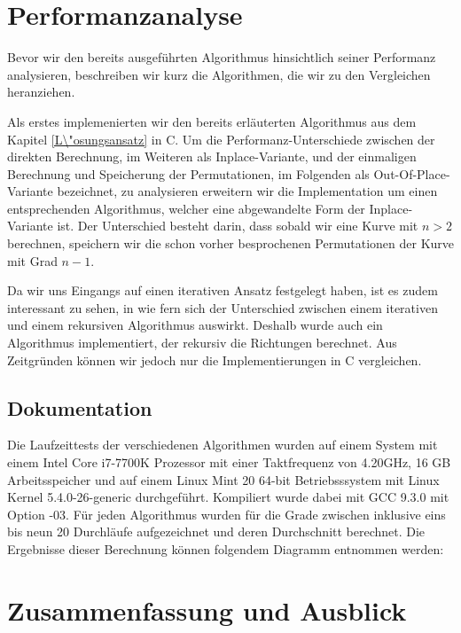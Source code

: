 \documentclass[course=asp]{aspdoc}
\begin{document}
\newpage
\section{Performanzanalyse} \label{Performanzanalyse}
Bevor wir den bereits ausgef\"uhrten Algorithmus hinsichtlich seiner Performanz analysieren, beschreiben wir kurz die Algorithmen, die wir zu den Vergleichen heranziehen.

Als erstes implemenierten wir den bereits erl\"auterten Algorithmus aus dem Kapitel \ref{L\"osungsansatz} in C. Um die Performanz-Unterschiede zwischen der direkten Berechnung, im Weiteren als Inplace-Variante, und der einmaligen Berechnung und Speicherung der Permutationen, im Folgenden als Out-Of-Place-Variante bezeichnet, zu analysieren erweitern wir die Implementation um einen entsprechenden Algorithmus, welcher eine abgewandelte Form der Inplace-Variante ist. Der Unterschied besteht darin, dass sobald wir eine Kurve mit $n > 2$ berechnen, speichern wir die schon vorher besprochenen Permutationen der Kurve mit Grad $n - 1$. 

Da wir uns Eingangs auf einen iterativen Ansatz festgelegt haben, ist es zudem interessant zu sehen, in wie fern sich der Unterschied zwischen einem iterativen und einem rekursiven Algorithmus auswirkt. Deshalb wurde auch ein Algorithmus implementiert, der rekursiv die Richtungen berechnet. Aus Zeitgr\"unden k\"onnen wir jedoch nur die Implementierungen in C vergleichen. 

\subsection{Dokumentation}

Die Laufzeittests der verschiedenen Algorithmen wurden auf einem System mit einem Intel Core i7-7700K Prozessor mit einer Taktfrequenz von 4.20GHz, 16 GB Arbeitsspeicher und auf einem Linux Mint 20 64-bit Betriebsssystem mit Linux Kernel 5.4.0-26-generic durchgef\"uhrt. Kompiliert wurde dabei mit GCC 9.3.0 mit Option -03.
F\"ur jeden Algorithmus wurden f\"ur die Grade zwischen inklusive eins bis neun 20 Durchl\"aufe aufgezeichnet und deren Durchschnitt berechnet. Die Ergebnisse dieser Berechnung k\"onnen folgendem Diagramm entnommen werden:

\newpage
\section{Zusammenfassung und Ausblick} \label{Zusammenfassung und Ausblick}
\end{document}
